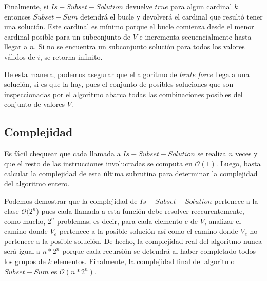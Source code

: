 Finalmente, si $Is-Subset-Solution$ devuelve $true$ para algun cardinal $k$ entonces $Subset-Sum$ detendrá el bucle y devolverá el cardinal que resultó tener una solución. Este cardinal es mínimo porque el bucle comienza desde el menor cardinal posible para un subconjunto de $V$ e incrementa secuencialmente hasta llegar a $n$. Si no se encuentra un subconjunto solución para todos los valores válidos de $i$, se retorna infinito.

\vskip 8pt

De esta manera, podemos asegurar que el algoritmo de \textit{brute force} llega a una solución, si es que la hay, pues el conjunto de posibles soluciones que son inspeccionadas por el algoritmo abarca todas las combinaciones posibles del conjunto de valores $V$.

\subsection{Complejidad}
Es fácil chequear que cada llamada a $Is-Subset-Solution$ se realiza $n$ veces y que el resto de las instrucciones involucradas se computa en $\mathcal{O}(1)$. Luego, basta calcular la complejidad de esta última subrutina para determinar la complejidad del algoritmo entero.

\vskip 8pt

Podemos demostrar que la complejidad de $Is-Subset-Solution$ pertenece a la clase $\mathcal{O}(2^{n}$) pues cada llamada a esta función debe resolver reccurentemente, como mucho, $2^{n}$ problemas; es decir, para cada elemento $e$ de $V$, analizar el camino donde $V_{e}$ pertenece a la posible solución así como el camino donde $V_{e}$ no pertenece a la posible solución. De hecho, la complejidad real del algoritmo nunca será igual a $n*2^{n}$ porque cada recursión se detendrá al haber completado todos los grupos de $k$ elementos. Finalmente, la complejidad final del algoritmo $Subset-Sum$ es $\mathcal{O}(n*2^n)$.
